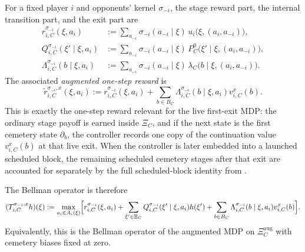\documentclass[12pt]{article}
\theoremstyle{definition}
\newcommand{\1}{\mathbf{1}}
\begin{document}
For a fixed player $i$ and opponents' kernel $\sigma_{-i}$, the stage reward part,
the internal transition part, and the exit part are
\begin{align}
\label{eq:r-sigma}
r_{i,C}^{\sigma_{-i}}(\xi,a_i)
&:=
\sum_{a_{-i}}\sigma_{-i}(a_{-i}\mid\xi)
\,u_i\bigl(\xi,(a_i,a_{-i})\bigr),
\\
\label{eq:Q-sigma}
Q_{i,C}^{\sigma_{-i}}(\xi'\mid \xi,a_i)
&:=
\sum_{a_{-i}}\sigma_{-i}(a_{-i}\mid\xi)
\,P_C^0\bigl(\xi'\mid\xi,(a_i,a_{-i})\bigr),
\\
\label{eq:q-exit-sigma}
\Lambda_{i,C}^{\sigma_{-i}}(b\mid\xi,a_i)
&:=
\sum_{a_{-i}}\sigma_{-i}(a_{-i}\mid\xi)
\,\lambda_C\bigl(b\mid\xi,(a_i,a_{-i})\bigr).
\end{align}
The associated \emph{augmented one-step reward} is
\begin{equation}
\label{eq:augmented-reward}
\widetilde r_{i,C}^{\sigma_{-i},x}(\xi,a_i)
:=
r_{i,C}^{\sigma_{-i}}(\xi,a_i)
+
\sum_{b\in B_C}\Lambda_{i,C}^{\sigma_{-i}}(b\mid\xi,a_i)v_{i,C}^x(b).
\end{equation}
This is exactly the one-step reward relevant for the live first-exit MDP: the
ordinary stage payoff is earned inside $\Xi_C$, and if the next state is the
first cemetery state $\partial_b$, the controller records one copy of the
continuation value $v_{i,C}^x(b)$ at that live exit. When the controller is later
embedded into a launched scheduled block, the remaining scheduled cemetery stages
after that exit are accounted for separately by the full scheduled-block identity
from .

The Bellman operator is therefore
\begin{equation}
\label{eq:Bellman-operator}
(T_{i,C}^{\sigma_{-i},x}h)(\xi)
:=
\max_{a_i\in A_i(\xi)}\Bigl[
 r_{i,C}^{\sigma_{-i}}(\xi,a_i)
 +\sum_{\xi'\in\Xi_C}Q_{i,C}^{\sigma_{-i}}(\xi'\mid\xi,a_i)h(\xi')
 +\sum_{b\in B_C}\Lambda_{i,C}^{\sigma_{-i}}(b\mid\xi,a_i)v_{i,C}^x(b)
 \Bigr].
\end{equation}
Equivalently, this is the Bellman operator of the augmented MDP on
$\Xi_C^{\mathrm{aug}}$ with cemetery biases fixed at zero.
\end{document}
